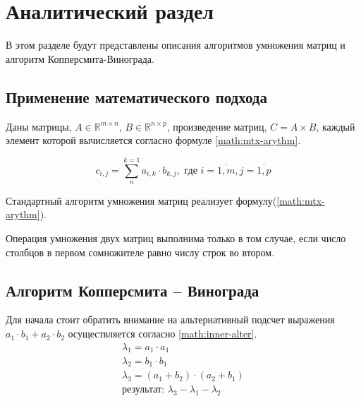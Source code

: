 \chapter{Аналитический раздел}\label{analyth}

В этом разделе будут представлены описания алгоритмов умножения матриц и алгоритм Копперсмита-Винограда.


\section{Применение математического подхода}
Даны матрицы, $A \in \mathbb{R}^{m \times n}$, $B \in \mathbb{R}^{n \times p}$, произведение матриц, $C = A \times B$, каждый элемент которой вычисляется согласно формуле \ref{math:mtx-arythm}.

\begin{equation}\label{math:mtx-arythm} 
	c_{i,j} = \sum_{n}^{k = 1}a_{i, k}\cdot b_{k, j}, \text{  где } i = \overline{1, m}, j = \overline{1, p} 
\end{equation}

\noindent Стандартный алгоритм умножения матриц реализует формулу(\ref{math:mtx-arythm}). 

Операция умножения двух матриц выполнима только в том случае, если число столбцов в первом сомножителе равно числу строк во втором.  

\section{Алгоритм Копперсмита – Винограда}
Для начала стоит обратить внимание на альтернативный подсчет выражения $a_1 \cdot b_1 + a_2 \cdot b_2$ осуществляется согласно \ref{math:inner-alter}.
\begin{equation}\label{math:inner-alter}
	\begin{array}{llll}
		\lambda_1 = a_1 \cdot a_1 \\
		\lambda_2 = b_1 \cdot b_1 \\
		\lambda_3 = (a_1 + b_2) \cdot (a_2 + b_1) \\
		\text{результат: } \lambda_3 - \lambda_1 - \lambda_2 \\ 
	\end{array}
\end{equation}

